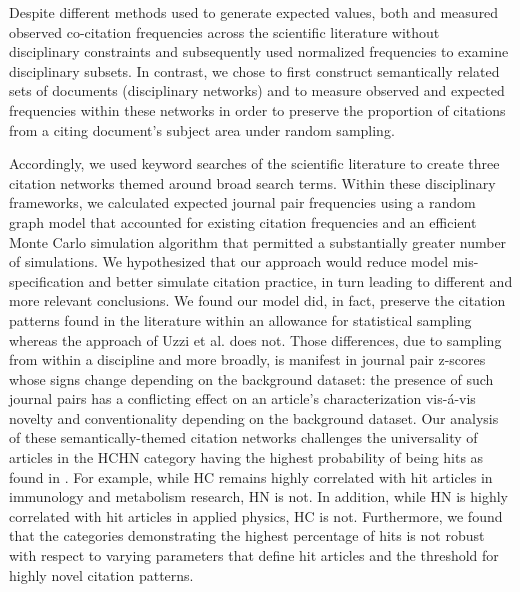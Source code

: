 \documentclass[NETN]{stjour}
\begin{document}
Despite different methods used to generate expected values, both \citep{uzzi_atypical_2013} and \citep{boyack_vs_uzzi_2014} measured observed co-citation frequencies across the scientific literature without disciplinary constraints and subsequently used normalized frequencies to examine disciplinary subsets. In contrast, we chose to first construct semantically related sets of documents (disciplinary networks) and to measure observed and expected frequencies within these networks in order to preserve the proportion of citations from a citing document's subject area under random sampling. 

Accordingly, we used keyword searches of the scientific literature to create three citation networks themed around broad search terms. Within these disciplinary frameworks, we calculated expected journal pair frequencies using a random graph model that accounted for existing citation frequencies and an efficient Monte Carlo simulation algorithm that permitted a substantially greater number of simulations. We hypothesized that our approach would reduce model mis-specification and better simulate citation practice, in turn leading to different and more relevant conclusions. We found our model did, in fact, preserve the citation patterns found in the literature within an allowance for statistical sampling whereas the approach of Uzzi et al. does not. Those differences, due to sampling from within a discipline and more broadly, is manifest in journal pair z-scores whose signs change depending on the background dataset: the presence of such journal pairs has a conflicting effect on an article's characterization vis-\'a-vis novelty and conventionality depending on the background dataset. Our analysis of these semantically-themed citation networks challenges the universality of articles in the HCHN category having the highest probability of being hits as found in \cite{uzzi_atypical_2013}. For example, while HC remains highly correlated with hit articles in immunology and metabolism research, HN is not. In addition, while HN is highly correlated with hit articles in applied physics, HC is not.  Furthermore, we found that the categories demonstrating the highest percentage of hits is not robust with respect to varying parameters that define hit articles and the threshold for highly novel citation patterns. 
\end{document}
